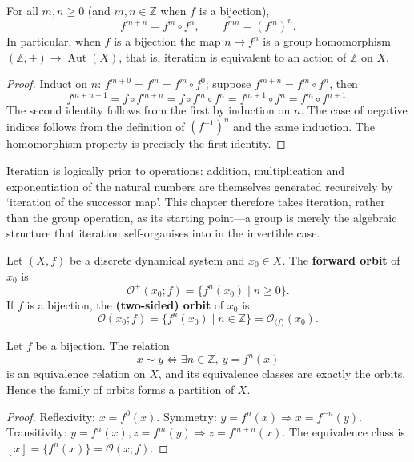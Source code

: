 \begin{property}\label{prop:iteration_law}
For all $m,n\ge 0$ (and $m,n\in\mathbb{Z}$ when $f$ is a bijection),
\[
f^{m+n}=f^m\circ f^n,\qquad f^{mn}=(f^m)^n.
\]
In particular, when $f$ is a bijection the map $n\mapsto f^n$ is a group homomorphism $(\mathbb{Z},+)\to\operatorname{Aut}(X)$, that is, iteration is equivalent to an action of $\mathbb{Z}$ on $X$.
\end{property}

\begin{proof}
Induct on $n$: $f^{m+0}=f^m=f^m\circ f^0$; suppose $f^{m+n}=f^m\circ f^n$, then
\[
f^{m+n+1}=f\circ f^{m+n}=f\circ f^m\circ f^n=f^{m+1}\circ f^n=f^m\circ f^{n+1}.
\]
The second identity follows from the first by induction on $n$. The case of negative indices follows from the definition of $(f^{-1})^n$ and the same induction. The homomorphism property is precisely the first identity.
\end{proof}

\begin{remark}\label{rem:iteration_primordial}
Iteration is logically prior to operations: addition, multiplication and exponentiation of the natural numbers are themselves generated recursively by `iteration of the successor map'. This chapter therefore takes iteration, rather than the group operation, as its starting point---a group is merely the algebraic structure that iteration self-organises into in the invertible case.
\end{remark}

\begin{definition}[Orbit]\label{def:orbit}
Let $(X,f)$ be a discrete dynamical system and $x_0\in X$. The \textbf{forward orbit} of $x_0$ is
\[
\mathcal{O}^+(x_0;f)=\{f^n(x_0)\mid n\ge 0\}.
\]
If $f$ is a bijection, the \textbf{(two-sided) orbit} of $x_0$ is
\[
\mathcal{O}(x_0;f)=\{f^n(x_0)\mid n\in\mathbb{Z}\}=\mathcal{O}_{\langle f\rangle}(x_0).
\]
\end{definition}

\begin{proposition}\label{prop:orbit_partition}
Let $f$ be a bijection. The relation
\[
x\sim y \iff \exists n\in\mathbb{Z},\ y=f^n(x)
\]
is an equivalence relation on $X$, and its equivalence classes are exactly the orbits. Hence the family of orbits forms a partition of $X$.
\end{proposition}

\begin{proof}
Reflexivity: $x=f^0(x)$. Symmetry: $y=f^n(x)\Rightarrow x=f^{-n}(y)$. Transitivity: $y=f^n(x),z=f^m(y)\Rightarrow z=f^{m+n}(x)$. The equivalence class is $[x]=\{f^n(x)\}=\mathcal{O}(x;f)$.
\end{proof}

